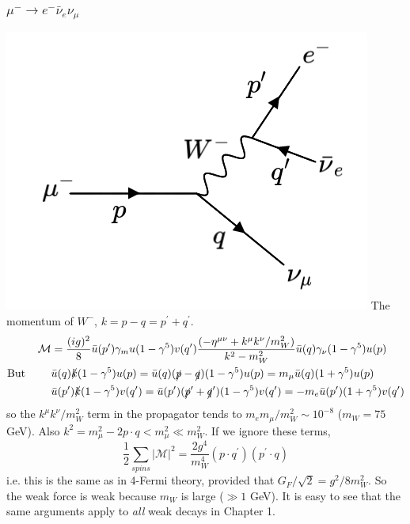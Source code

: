 \documentclass[a4paper,12pt]{article}
\begin{document}
\subsubsection{$\mu^- \to e^-\bar{\nu}_e\nu_\mu$}
  \includegraphics[width=0.4\linewidth]{figs/17b.png}
The momentum of $W^-$, $k=p-q=p^\prime + q^\prime$.
\begin{equation}
\begin{split}
\mathcal{M}& = \frac{(ig)^2}{8}\bar{u}(p^\prime)\gamma_mu(1-\gamma^5)v(q^\prime)\frac{(-\eta^{\mu \nu} + k^\mu k^\nu/m_W^2)}{k^2-m_W^2}\bar{u}(q)\gamma_\nu(1-\gamma^5)u(p) \\
\text{But } \qquad &\bar{u}(q)\slashed{k}(1-\gamma^5)u(p) = \bar{u}(q)(\slashed{p}-\slashed{q})(1-\gamma^5)u(p) = m_\mu \bar{u}(q)(1+\gamma^5)u(p) \\
&\bar{u}(p^\prime)\slashed{k}(1-\gamma^5)v(q^\prime) = \bar{u}(p^\prime)(\slashed{p}^\prime+\slashed{q}^\prime)(1-\gamma^5)v(q^\prime) = -m_e \bar{u}(p^\prime)(1+\gamma^5)v(q^\prime) 
\end{split}
\end{equation}
so the $k^\mu k^\nu/m_W^2$ term in the propagator tends to $m_e m_\mu/m_W^2 \sim 10^{-8}$ ($m_W=75$ GeV). Also $k^2 = m_\mu^2 - 2p \cdot q < m_\mu^2 \ll m_W^2$. If we ignore these terms, 
\begin{equation}
\frac{1}{2}\sum_{spins}|\mathcal{M}|^2 = \frac{2g^4}{m_W^4}(p \cdot q^\prime)(p^\prime \cdot q)
\end{equation}
i.e. this is the same as in 4-Fermi theory, provided that $G_F/\sqrt{2} = g^2/8m_W^2$. So the weak force is weak because $m_W$ is large ($\gg 1$ GeV). It is easy to see that the same arguments apply to \textit{all} weak decays in Chapter 1. 
%
\end{document}
